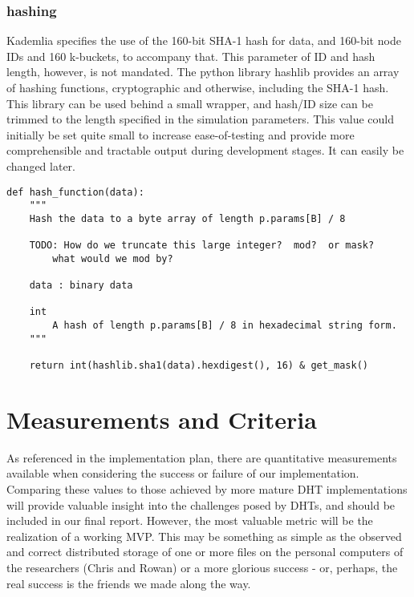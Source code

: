 \documentclass[12pt]{report}
\begin{document}
            \subsubsection{hashing}
                Kademlia specifies the use of the 160-bit SHA-1 hash for data,
                and 160-bit node IDs and 160 k-buckets, to accompany that.
                This parameter of ID and hash length, however, is not mandated.
                The python library hashlib provides an array of hashing
                functions, cryptographic and otherwise, including the SHA-1
                hash.  This library can be used behind a small wrapper, and
                hash/ID size can be trimmed to the length specified in the
                simulation parameters.  This value could initially be set quite
                small to increase ease-of-testing and provide more
                comprehensible and tractable output during development stages.
                It can easily be changed later.
\begin{lstlisting}[label=hashing.py]
def hash_function(data):
    """
    Hash the data to a byte array of length p.params[B] / 8

    TODO: How do we truncate this large integer?  mod?  or mask?
        what would we mod by?

    data : binary data
    
    int 
        A hash of length p.params[B] / 8 in hexadecimal string form.
    """
        
    return int(hashlib.sha1(data).hexdigest(), 16) & get_mask() 
\end{lstlisting}

    \section{Measurements and Criteria}
    As referenced in the implementation plan, there are quantitative
    measurements available when considering the success or failure of our
    implementation.  Comparing these values to those achieved by more mature
    DHT implementations will provide valuable insight into the challenges posed
    by DHTs, and should be included in our final report.  However, the most
    valuable metric will be the realization of a working MVP.  This may be
    something as simple as the observed and correct distributed storage of one
    or more files on the personal computers of the researchers (Chris and
    Rowan) or a more glorious success - or, perhaps, the real success is the
    friends we made along the way.
\end{document}
